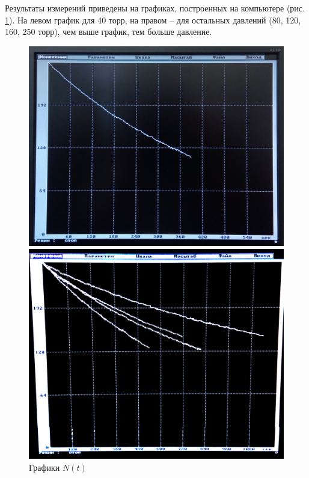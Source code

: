 \documentclass[12pt]{article}
\newcommand{\fref}[1]{рис. \ref{#1}}
\begin{document}
	Результаты измерений приведены на графиках, построенных на компьютере (\fref{graphs}). На левом график для 40 торр, на правом -- для остальных давлений (80, 120, 160, 250 торр), чем выше график, тем больше давление.
	\begin{figure}[!h]
		\caption{Графики $N(t)$}
		\label{graphs}
		\begin{minipage}{0.49\linewidth}
			\includegraphics[scale=0.14]{graph-40t.jpg}
		\end{minipage}
		\begin{minipage}{0.49\linewidth}
			\includegraphics[scale=0.105]{graph-all.jpg}
		\end{minipage}
	\end{figure}
	
\end{document}

